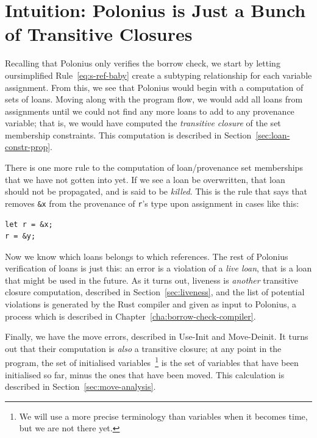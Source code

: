 \documentclass[11pt,a4paper,twoside,openany]{report}
\newcommand{\InRust}[1]{\texttt{#1}}
\renewcommand\_{\textunderscore\allowbreak}
\begin{document}
\section{Intuition: Polonius is Just a Bunch of Transitive
  Closures}\label{sec:borrow-check-intuition}

Recalling that Polonius only verifies the borrow check, we start by letting
oursimplified Rule~\eqref{eq:s-ref-baby} create a subtyping relationship for
each variable assignment. From this, we see that Polonius would begin with a
computation of sets of loans. Moving along with the program flow, we would add
all loans from assignments until we could not find any more loans to add to any
provenance variable; that is, we would have computed the \textit{transitive
  closure} of the set membership constraints. This computation is described in
Section~\ref{sec:loan-constr-prop}.

There is one more rule to the computation of loan/provenance set memberships
that we have not gotten into yet. If we see a loan be overwritten, that
loan should not be propagated, and is said to be \textit{killed}. This is the
rule that says that removes \InRust{&x} from the provenance of \InRust{r}'s type
upon assignment in cases like this:
\begin{verbatim}
let r = &x;
r = &y;
\end{verbatim}

Now we know which loans belongs to which references. The rest of Polonius
verification of loans is just this: an error is a violation of a \textit{live
  loan}, that is a loan that might be used in the future. As it turns out,
liveness is \textit{another} transitive closure computation, described in
Section~\ref{sec:liveness}, and the list of potential violations is generated by
the Rust compiler and given as input to Polonius, a process which is described
in Chapter~\ref{cha:borrow-check-compiler}.

Finally, we have the move errors, described in Use-Init and Move-Deinit. It
turns out that their computation is \textit{also} a transitive closure; at any
point in the program, the set of initialised variables~\footnote{We will use a
  more precise terminology than variables when it becomes time, but we are not
  there yet.} is the set of variables that have been initialised so far, minus
the ones that have been moved. This calculation is described in
Section~\ref{sec:move-analysis}.
\end{document}
